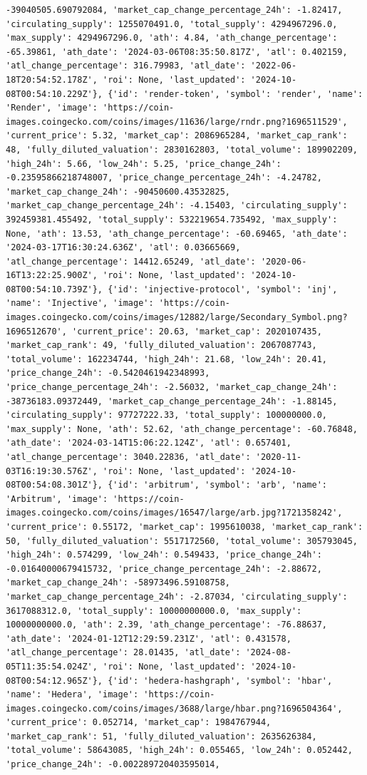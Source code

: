 \documentclass[
  letterpaper,
  DIV=11,
  numbers=noendperiod]{scrreprt}
\begin{document}
\begin{verbatim}
-39040505.690792084, 'market_cap_change_percentage_24h': -1.82417, 'circulating_supply': 1255070491.0, 'total_supply': 4294967296.0, 'max_supply': 4294967296.0, 'ath': 4.84, 'ath_change_percentage': -65.39861, 'ath_date': '2024-03-06T08:35:50.817Z', 'atl': 0.402159, 'atl_change_percentage': 316.79983, 'atl_date': '2022-06-18T20:54:52.178Z', 'roi': None, 'last_updated': '2024-10-08T00:54:10.229Z'}, {'id': 'render-token', 'symbol': 'render', 'name': 'Render', 'image': 'https://coin-images.coingecko.com/coins/images/11636/large/rndr.png?1696511529', 'current_price': 5.32, 'market_cap': 2086965284, 'market_cap_rank': 48, 'fully_diluted_valuation': 2830162803, 'total_volume': 189902209, 'high_24h': 5.66, 'low_24h': 5.25, 'price_change_24h': -0.23595866218748007, 'price_change_percentage_24h': -4.24782, 'market_cap_change_24h': -90450600.43532825, 'market_cap_change_percentage_24h': -4.15403, 'circulating_supply': 392459381.455492, 'total_supply': 532219654.735492, 'max_supply': None, 'ath': 13.53, 'ath_change_percentage': -60.69465, 'ath_date': '2024-03-17T16:30:24.636Z', 'atl': 0.03665669, 'atl_change_percentage': 14412.65249, 'atl_date': '2020-06-16T13:22:25.900Z', 'roi': None, 'last_updated': '2024-10-08T00:54:10.739Z'}, {'id': 'injective-protocol', 'symbol': 'inj', 'name': 'Injective', 'image': 'https://coin-images.coingecko.com/coins/images/12882/large/Secondary_Symbol.png?1696512670', 'current_price': 20.63, 'market_cap': 2020107435, 'market_cap_rank': 49, 'fully_diluted_valuation': 2067087743, 'total_volume': 162234744, 'high_24h': 21.68, 'low_24h': 20.41, 'price_change_24h': -0.5420461942348993, 'price_change_percentage_24h': -2.56032, 'market_cap_change_24h': -38736183.09372449, 'market_cap_change_percentage_24h': -1.88145, 'circulating_supply': 97727222.33, 'total_supply': 100000000.0, 'max_supply': None, 'ath': 52.62, 'ath_change_percentage': -60.76848, 'ath_date': '2024-03-14T15:06:22.124Z', 'atl': 0.657401, 'atl_change_percentage': 3040.22836, 'atl_date': '2020-11-03T16:19:30.576Z', 'roi': None, 'last_updated': '2024-10-08T00:54:08.301Z'}, {'id': 'arbitrum', 'symbol': 'arb', 'name': 'Arbitrum', 'image': 'https://coin-images.coingecko.com/coins/images/16547/large/arb.jpg?1721358242', 'current_price': 0.55172, 'market_cap': 1995610038, 'market_cap_rank': 50, 'fully_diluted_valuation': 5517172560, 'total_volume': 305793045, 'high_24h': 0.574299, 'low_24h': 0.549433, 'price_change_24h': -0.01640000679415732, 'price_change_percentage_24h': -2.88672, 'market_cap_change_24h': -58973496.59108758, 'market_cap_change_percentage_24h': -2.87034, 'circulating_supply': 3617088312.0, 'total_supply': 10000000000.0, 'max_supply': 10000000000.0, 'ath': 2.39, 'ath_change_percentage': -76.88637, 'ath_date': '2024-01-12T12:29:59.231Z', 'atl': 0.431578, 'atl_change_percentage': 28.01435, 'atl_date': '2024-08-05T11:35:54.024Z', 'roi': None, 'last_updated': '2024-10-08T00:54:12.965Z'}, {'id': 'hedera-hashgraph', 'symbol': 'hbar', 'name': 'Hedera', 'image': 'https://coin-images.coingecko.com/coins/images/3688/large/hbar.png?1696504364', 'current_price': 0.052714, 'market_cap': 1984767944, 'market_cap_rank': 51, 'fully_diluted_valuation': 2635626384, 'total_volume': 58643085, 'high_24h': 0.055465, 'low_24h': 0.052442, 'price_change_24h': -0.002289720403595014, 
\end{verbatim}
\end{document}
